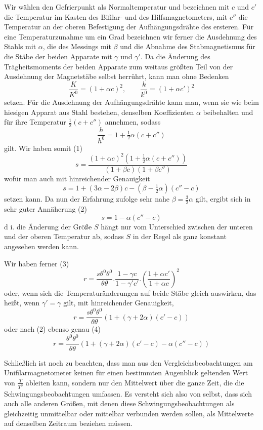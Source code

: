 Wir wählen den Gefrierpunkt als Normaltemperatur und bezeichnen mit $c$ und $c'$ die Temperatur im Kasten des Bifilar- und des Hilfsmagnetometers, mit $c''$ die Temperatur an der oberen Befestigung der Aufhängungsdrähte des ersteren. Für eine Temperaturzunahme um ein Grad bezeichnen wir ferner die Ausdehnung des Stahls mit $\alpha$, die des Messings mit $\beta$ und die Abnahme des Stabmagnetismus für die Stäbe der beiden Apparate mit $\gamma$ und $\gamma'$. Da die Änderung des Trägheitsmoments der beiden Apparate zum weitaus größten Teil von der Ausdehnung der Magnetstäbe selbst herrührt, kann man ohne Bedenken
\[
\frac{K}{K^0}=(1+\alpha c)^2,\qquad \frac{k}{k^0}=(1+\alpha c')^2
\]
setzen. Für die Ausdehnung der Aufhängungsdrähte kann man, wenn sie wie beim hiesigen Apparat aus Stahl bestehen, denselben Koeffizienten $\alpha$ beibehalten und für ihre Temperatur $\tfrac{1}{2}(c+c'')$ annehmen, sodass
\[
\frac{h}{h^0}=1+\tfrac{1}{2}\alpha(c+c'')
\]
gilt. Wir haben somit (1)
\[
s=\frac{(1+\alpha c)^2(1+\tfrac{1}{2}\alpha(c+c''))}{(1+\beta c)(1+\beta c'')}
\]
wofür man auch mit hinreichender Genauigkeit
\[
s=1+(3\alpha-2\beta)c-(\beta-\tfrac{1}{2}\alpha)(c''-c)
\]
setzen kann. Da nun der Erfahrung zufolge sehr nahe $\beta=\tfrac{3}{2}\alpha$ gilt, ergibt sich in sehr guter Annäherung (2)
\[
s=1-\alpha(c''-c)
\]
d i. die Änderung der Größe $S$ hängt nur vom Unterschied zwischen der unteren und der oberen Temperatur ab, sodass $S$ in der Regel als ganz konstant angesehen werden kann.

Wir haben ferner (3)
\[
r=\frac{s\theta^0\theta^0}{\theta\theta}.\frac{1-\gamma c}{1-\gamma'c'}.\left(\frac{1+\alpha c'}{1+\alpha c}\right)^2
\]
oder, wenn sich die Temperaturänderungen auf beide Stäbe gleich auswirken, das heißt, wenn $\gamma'=\gamma$ gilt, mit hinreichender Genauigkeit,
\[
r=\frac{s\theta^0\theta^0}{\theta\theta}(1+(\gamma+2\alpha)(c'-c))
\]
oder nach (2) ebenso genau (4)
\[
r=\frac{\theta^0\theta^0}{\theta\theta}(1+(\gamma+2\alpha)(c'-c)-\alpha(c''-c))
\]

Schließlich ist noch zu beachten, dass man aus den Vergleichsbeobachtungen am Unifilarmagnetometer keinen für einen bestimmten Augenblick geltenden Wert von $\frac{T}{T^0}$ ableiten kann, sondern nur den Mittelwert über die ganze Zeit, die die Schwingungsbeobachtungen umfassen. Es versteht sich also von selbst, dass sich auch alle anderen Größen, mit denen diese Schwingungsbeobachtungen als gleichzeitig unmittelbar oder mittelbar verbunden werden sollen, als Mittelwerte auf denselben Zeitraum beziehen müssen.


